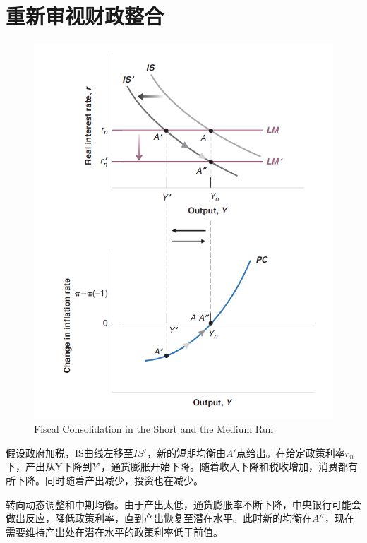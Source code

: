 \documentclass{article}
\begin{document}
\hspace*{\fill}

\section{重新审视财政整合}

\begin{figure}[H] %
	\centering %
	\includegraphics[width=1\textwidth]{9_4} %
	\caption{Fiscal Consolidation
		in the Short and the
		Medium Run} %
	\label{Fig.main5} %
\end{figure}

假设政府加税，IS曲线左移至$ IS' $，新的短期均衡由$ A' $点给出。在给定政策利率$ r_n $下，产出从Y下降到$ Y' $，通货膨胀开始下降。随着收入下降和税收增加，消费都有所下降。同时随着产出减少，投资也在减少。

转向动态调整和中期均衡。由于产出太低，通货膨胀率不断下降，中央银行可能会做出反应，降低政策利率，直到产出恢复至潜在水平。此时新的均衡在$ A'' $，现在需要维持产出处在潜在水平的政策利率低于前值。
\end{document}
